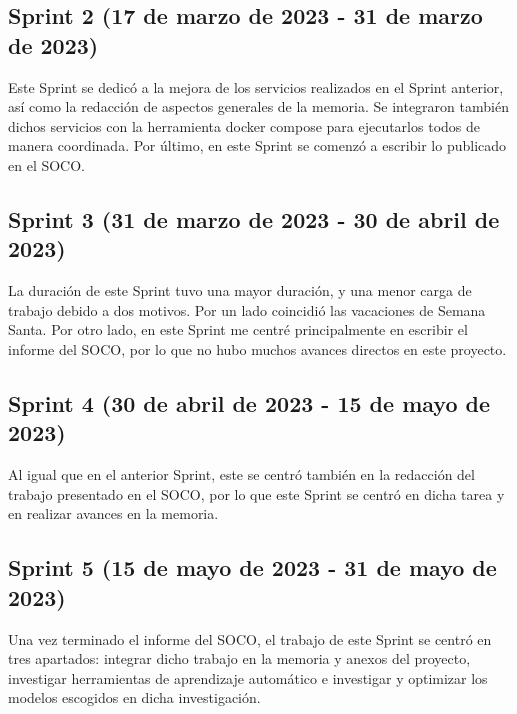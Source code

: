 
\subsection{Sprint 2 (17 de marzo de 2023 - 31 de marzo de 2023)}

Este Sprint se dedicó a la mejora de los servicios realizados en el Sprint anterior, así como la redacción de aspectos 
generales de la memoria. Se integraron también dichos servicios con la herramienta docker compose para ejecutarlos todos 
de manera coordinada. Por último, en este Sprint se comenzó a escribir lo publicado en el SOCO.


\subsection{Sprint 3 (31 de marzo de 2023 - 30 de abril de 2023)}

La duración de este Sprint tuvo una mayor duración, y una menor carga de trabajo debido a dos motivos. Por un lado
coincidió las vacaciones de Semana Santa. Por otro lado, en este Sprint me centré principalmente en escribir el informe 
del SOCO, por lo que no hubo muchos avances directos en este proyecto.


\subsection{Sprint 4 (30 de abril de 2023 - 15 de mayo de 2023)}

Al igual que en el anterior Sprint, este se centró también en la redacción del trabajo presentado en el SOCO, por lo 
que este Sprint se centró en dicha tarea y en realizar avances en la memoria.


\subsection{Sprint 5 (15 de mayo de 2023 - 31 de mayo de 2023)}

Una vez terminado el informe del SOCO, el trabajo de este Sprint se centró en tres apartados: integrar dicho trabajo 
en la memoria y anexos del proyecto, investigar herramientas de aprendizaje automático e investigar y optimizar 
los modelos escogidos en dicha investigación.

